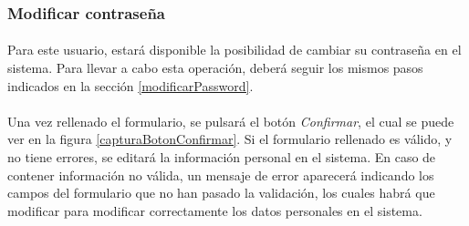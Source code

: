   \subsubsection{Modificar contraseña}

  \paragraph{}Para este usuario, estará disponible la posibilidad de cambiar su
  contraseña en el sistema. Para llevar a cabo esta operación, deberá seguir los
  mismos pasos indicados en la sección \ref{modificarPassword}.

  \paragraph{}Una vez rellenado el formulario, se pulsará el botón
  \textit{Confirmar}, el cual se puede ver en la figura
  \ref{capturaBotonConfirmar}. Si el formulario rellenado es válido, y no tiene
  errores, se editará la información personal en el sistema. En caso de
  contener información no válida, un mensaje de error aparecerá indicando los
  campos del formulario que no han pasado la validación, los cuales habrá que
  modificar para modificar correctamente los datos personales en el sistema.
